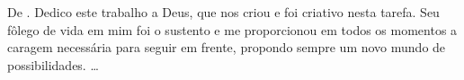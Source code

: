 \begin{dedicatoria}
\vspace*{\fill}
\vspace*{\fill}
\vspace*{\fill}
\vspace*{\fill}
\vspace*{\fill}
\vspace*{\fill}

De \imprimirAutorUm.
\newline
Dedico este trabalho a Deus, que nos criou e foi criativo nesta tarefa. Seu
fôlego de vida em mim foi o sustento e me proporcionou em todos os momentos a
caragem necessária para seguir em frente, propondo sempre um novo mundo de
possibilidades.
\ldots


\end{dedicatoria}
